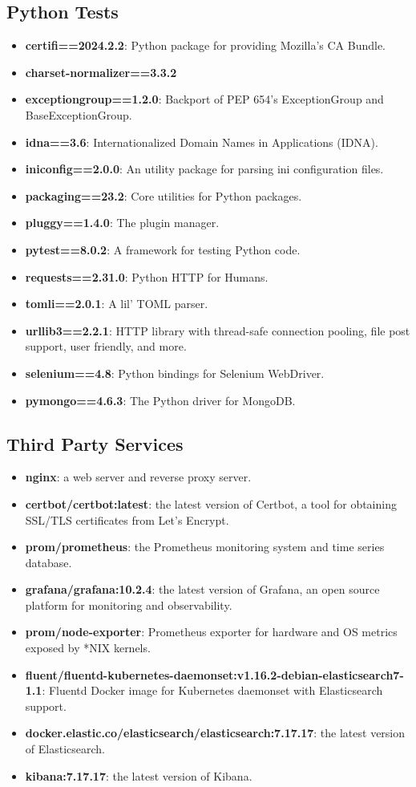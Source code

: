 \documentclass{article}
\begin{document}
\subsection*{Python Tests}
\begin{itemize}
    \item \textbf{certifi==2024.2.2}: Python package for providing Mozilla's CA Bundle.
    \item \textbf{charset-normalizer==3.3.2}
    \item \textbf{exceptiongroup==1.2.0}: Backport of PEP 654's ExceptionGroup and BaseExceptionGroup.
    \item \textbf{idna==3.6}: Internationalized Domain Names in Applications (IDNA).
    \item \textbf{iniconfig==2.0.0}: An utility package for parsing ini configuration files.
    \item \textbf{packaging==23.2}: Core utilities for Python packages.
    \item \textbf{pluggy==1.4.0}: The plugin manager.
    \item \textbf{pytest==8.0.2}: A framework for testing Python code.
    \item \textbf{requests==2.31.0}: Python HTTP for Humans.
    \item \textbf{tomli==2.0.1}: A lil' TOML parser.
    \item \textbf{urllib3==2.2.1}: HTTP library with thread-safe connection pooling, file post support, user friendly, and more.
    \item \textbf{selenium==4.8}: Python bindings for Selenium WebDriver.
    \item \textbf{pymongo==4.6.3}: The Python driver for MongoDB.
\end{itemize}

\subsection*{Third Party Services}
\begin{itemize}
    \item \textbf{nginx}: a web server and reverse proxy server.
    \item \textbf{certbot/certbot:latest}: the latest version of Certbot, a tool for obtaining SSL/TLS certificates from Let's Encrypt.
    \item \textbf{prom/prometheus}: the Prometheus monitoring system and time series database.
    \item \textbf{grafana/grafana:10.2.4}: the latest version of Grafana, an open source platform for monitoring and observability.
    \item \textbf{prom/node-exporter}: Prometheus exporter for hardware and OS metrics exposed by *NIX kernels.
    \item \textbf{fluent/fluentd-kubernetes-daemonset:v1.16.2-debian-elasticsearch7-1.1}: Fluentd Docker image for Kubernetes daemonset with Elasticsearch support.
    \item \textbf{docker.elastic.co/elasticsearch/elasticsearch:7.17.17}: the latest version of Elasticsearch.
    \item \textbf{kibana:7.17.17}: the latest version of Kibana.
\end{itemize}
\end{document}
